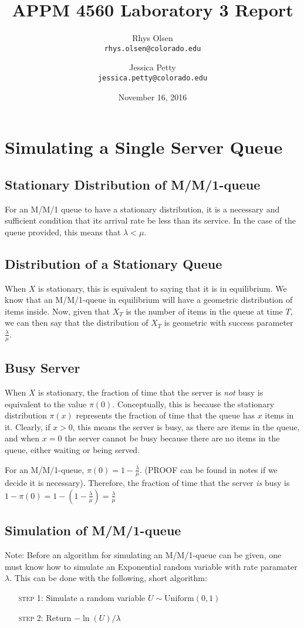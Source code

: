 \documentclass[11pt, oneside]{article}
\title{APPM 4560 Laboratory 3 Report}
\author{Rhys Olsen\\
\texttt{rhys.olsen@colorado.edu}
 \and Jessica Petty\\
 \texttt{jessica.petty@colorado.edu}
 }
\date{November 16, 2016}
\begin{document}
\maketitle
\section{Simulating a Single Server Queue}
\subsection{Stationary Distribution of M/M/1-queue}
For an M/M/1 queue to have a stationary distribution, it is a necessary and sufficient condition that its arrival rate be less than its service. In the case of the queue provided, this means that $\lambda < \mu$.

\subsection{Distribution of a Stationary Queue}
When $X$ is stationary, this is equivalent to saying that it is in equilibrium. We know that an M/M/1-queue in equilibrium will have a geometric distribution of items inside. Now, given that $X_T$ is the number of items in the queue at time $T$, we can then say that the distribution of $X_T$ is geometric with success parameter $\frac{\lambda}{\mu}$.

\subsection{Busy Server}
When $X$ is stationary, the fraction of time that the server is \textit{not} busy is equivalent to the value $\pi(0)$. Conceptually, this is because the stationary distribution $\pi(x)$ represents the fraction of time that the queue has $x$ items in it. Clearly, if $x > 0$, this means the server is busy, as there are items in the queue, and when $x=0$ the server cannot be busy because there are no items in the queue, either waiting or being served.

For an M/M/1-queue, $\pi(0)=1-\frac{\lambda}{\mu}$. (PROOF can be found in notes if we decide it is necessary). Therefore, the fraction of time that the server \textit{is} busy is $1-\pi(0)=1-(1-\frac{\lambda}{\mu})=\frac{\lambda}{\mu}$

\subsection{Simulation of M/M/1-queue}
Note: Before an algorithm for simulating an M/M/1-queue can be given, one must know how to simulate an Exponential random variable with rate paramater $\lambda$. This can be done with the following, short algorithm:
\begin{enumerate}[leftmargin=30pt,labelindent=65pt,itemindent=30pt]
\item[\textsc{step 1:}] Simulate a random variable $U \sim \text{Uniform}(0,1)$
\item[\textsc{step 2:}] Return $-\ln(U)/\lambda$
\end{enumerate}
\end{document}
